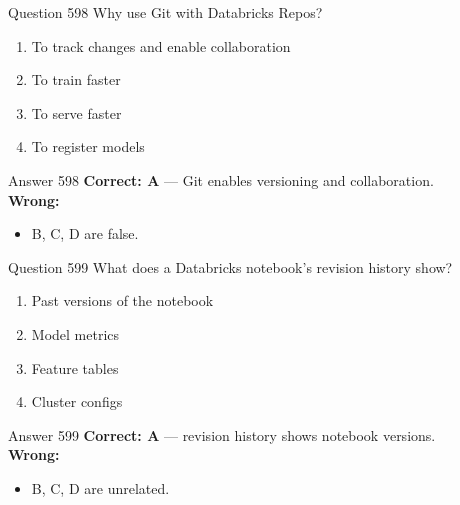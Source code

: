 \documentclass[aspectratio=169,11pt]{beamer}
\begin{document}
	\begin{frame}{Question 598}
		Why use Git with Databricks Repos?
		\begin{enumerate}[label=\Alph*.]
			\item To track changes and enable collaboration
			\item To train faster
			\item To serve faster
			\item To register models
		\end{enumerate}
	\end{frame}
	\begin{frame}{Answer 598}
		\textbf{Correct: A} --- Git enables versioning and collaboration.\\
		\vspace{0.5em}
		\textbf{Wrong:}
		\begin{itemize}
			\item B, C, D are false.
		\end{itemize}
	\end{frame}
	
	\begin{frame}{Question 599}
		What does a Databricks notebook's revision history show?
		\begin{enumerate}[label=\Alph*.]
			\item Past versions of the notebook
			\item Model metrics
			\item Feature tables
			\item Cluster configs
		\end{enumerate}
	\end{frame}
	\begin{frame}{Answer 599}
		\textbf{Correct: A} --- revision history shows notebook versions.\\
		\vspace{0.5em}
		\textbf{Wrong:}
		\begin{itemize}
			\item B, C, D are unrelated.
		\end{itemize}
	\end{frame}
	
\end{document}
